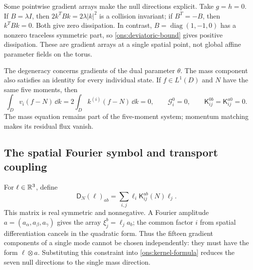 Some pointwise gradient arrays make the null directions explicit.
Take $g=h=0$. If $B=\lambda I$, then
$2k^TBk=2\lambda|k|^2$ is a collision invariant; if $B^T=-B$, then
$k^TBk=0$. Both give zero dissipation.
In contrast, $B=\operatorname{diag}(1,-1,0)$ has a nonzero traceless
symmetric part, so \eqref{ons:deviatoric-bound} gives positive dissipation.
These are gradient arrays at a single spatial point, not global affine
parameter fields on the torus.

The degeneracy concerns gradients of the dual parameter $\theta$.
The mass component also satisfies an identity for every individual state.
If $f\in L^1(D)$ and $N$ have the same five moments, then
\begin{equation}\label{ons:mass-flux}
 \int_Dv_i(f-N)\,\dd k=2\int_Dk^{(i)}(f-N)\,\dd k=0,
 \qquad\mathcal G_i^0=0,
 \qquad\mathsf K_{ij}^{0b}=\mathsf K_{ij}^{a0}=0.
\end{equation}
The mass equation remains part of the five-moment system; momentum
matching makes its residual flux vanish.

\subsection{The spatial Fourier symbol and transport coupling}

For $\ell\in\mathbb R^3$, define
\begin{equation}\label{ons:diffusion-symbol}
 \mathsf D_N(\ell)_{ab}
       =\sum_{i,j}\ell_i\mathsf K_{ij}^{ab}(N)\ell_j.
\end{equation}
This matrix is real symmetric and nonnegative. A Fourier amplitude
$a=(a_\alpha,a_\beta,a_\gamma)$ gives the array
$\xi_j^b=\ell_ja_b$; the common factor $i$ from spatial differentiation
cancels in the quadratic form. Thus the fifteen gradient components of
a single mode cannot be chosen independently: they must have the form
$\ell\otimes a$. Substituting this constraint into
\eqref{ons:kernel-formula} reduces the seven null directions to the
single mass direction.

